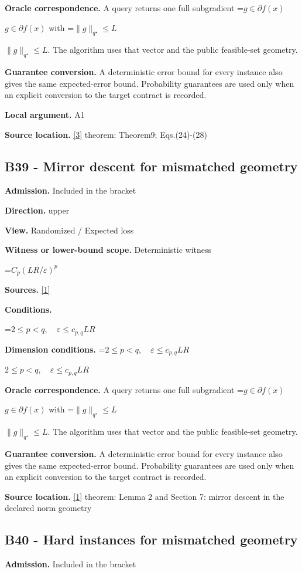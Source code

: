 \documentclass[10pt,a4paper]{article}
\newcommand{\AtlasMath}[1]{\par\begingroup\centering\setbox0=\hbox{$\displaystyle #1$}\ifdim\wd0>1.4\linewidth\typeout{ATLAS WIDE FORMULA: \the\wd0}\fi\ifdim\wd0>\linewidth\resizebox{\linewidth}{!}{\box0}\else\box0\fi\par\endgroup}
\newcommand{\AtlasInlineMath}[1]{\begingroup\setbox0=\hbox{$#1$}\ifdim\wd0>.4\linewidth\endgroup\AtlasMath{#1}\else\endgroup$#1$\fi}
\begin{document}
\textbf{Oracle correspondence.} A query returns one full subgradient \AtlasInlineMath{g\in\partial f(x)} with \AtlasInlineMath{\|g\|_{q^\star}\le L}. The algorithm uses that vector and the public feasible-set geometry.

\textbf{Guarantee conversion.} A deterministic error bound for every instance also gives the same expected-error bound. Probability guarantees are used only when an explicit conversion to the target contract is recorded.

\textbf{Local argument.} A1

\textbf{Source location.} \href{https://arxiv.org/pdf/2609.20701}{[3]} theorem: Theorem9; Eqs.(24)-(28)

\subsection{B39 - Mirror descent for mismatched geometry}
\textbf{Admission.} Included in the bracket

\textbf{Direction.} upper

\textbf{View.} Randomized / Expected loss

\textbf{Witness or lower-bound scope.} Deterministic witness

\AtlasMath{C_p(LR/\varepsilon)^p}
\textbf{Sources.} \href{https://arxiv.org/pdf/1107.4080}{[1]}

\textbf{Conditions.} 
\AtlasMath{2\le p<q,\quad\varepsilon\le c_{p,q}LR}


\textbf{Dimension conditions.} \AtlasInlineMath{2\le p<q,\quad\varepsilon\le c_{p,q}LR}

\textbf{Oracle correspondence.} A query returns one full subgradient \AtlasInlineMath{g\in\partial f(x)} with \AtlasInlineMath{\|g\|_{q^\star}\le L}. The algorithm uses that vector and the public feasible-set geometry.

\textbf{Guarantee conversion.} A deterministic error bound for every instance also gives the same expected-error bound. Probability guarantees are used only when an explicit conversion to the target contract is recorded.

\textbf{Source location.} \href{https://arxiv.org/pdf/1107.4080}{[1]} theorem: Lemma 2 and Section 7: mirror descent in the declared norm geometry

\subsection{B40 - Hard instances for mismatched geometry}
\textbf{Admission.} Included in the bracket
\end{document}
